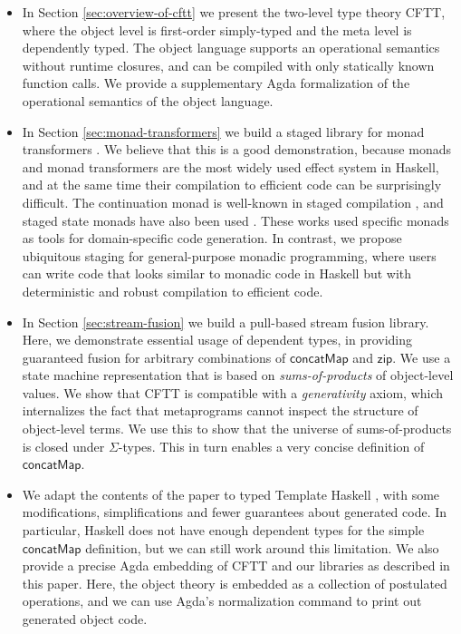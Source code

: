 \documentclass[acmsmall,screen]{acmart}
\newcommand{\mit}[1]{{\mathsf{#1}}}
\newcommand{\msf}[1]{{\mathsf{#1}}}
\newcommand{\concatMap}{\msf{concatMap}}
\theoremstyle{remark}
\begin{document}
\begin{itemize}
\item In Section \ref{sec:overview-of-cftt} we present the two-level type theory
  CFTT, where the object level is first-order simply-typed and the meta level is
  dependently typed. The object language supports an operational semantics
  without runtime closures, and can be compiled with only statically known
  function calls. We provide a supplementary Agda formalization of the
  operational semantics of the object language.
\item
  In Section \ref{sec:monad-transformers} we build a staged library for monad
  transformers \cite{DBLP:conf/popl/LiangHJ95}. We believe that this is a good
  demonstration, because monads and monad transformers are the most widely used
  effect system in Haskell, and at the same time their compilation to efficient
  code can be surprisingly difficult. The continuation monad is well-known in
  staged compilation \cite{DBLP:conf/lfp/Bondorf92}, and staged state monads
  have also been used
  \cite{DBLP:conf/pepm/SwadiTKP06,DBLP:conf/emsoft/KiselyovST04,DBLP:journals/scp/CaretteK11}.
  These works used specific monads as tools for domain-specific code
  generation. In contrast, we propose ubiquitous staging for general-purpose
  monadic programming, where users can write code that looks similar to monadic
  code in Haskell but with deterministic and robust compilation to efficient
  code.
\item In Section \ref{sec:stream-fusion} we build a pull-based stream fusion library. Here,
  we demonstrate essential usage of dependent types, in providing guaranteed
  fusion for arbitrary combinations of $\concatMap$ and $\mit{zip}$. We use a
  state machine representation that is based on \emph{sums-of-products} of
  object-level values. We show that CFTT is compatible with a
  \emph{generativity} axiom, which internalizes the fact that metaprograms
  cannot inspect the structure of object-level terms. We use this to show that
  the universe of sums-of-products is closed under $\Sigma$-types. This in turn
  enables a very concise definition of $\concatMap$.
\item
  We adapt the contents of the paper to typed Template Haskell
  \cite{DBLP:journals/pacmpl/XiePLWYW22}, with some modifications,
  simplifications and fewer guarantees about generated code.  In particular,
  Haskell does not have enough dependent types for the simple $\concatMap$
  definition, but we can still work around this limitation. We also provide a
  precise Agda embedding of CFTT and our libraries as described in this
  paper. Here, the object theory is embedded as a collection of postulated
  operations, and we can use Agda's normalization command to print out generated
  object code.
\end{itemize}
\end{document}

